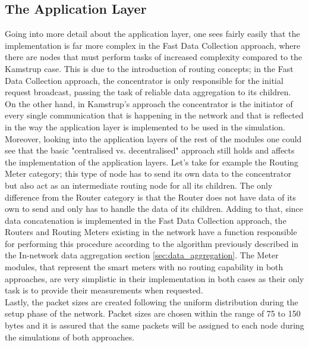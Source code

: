 \subsection{The Application Layer}
Going into more detail about the application layer, one sees fairly easily that the implementation is far more complex in the Fast Data Collection approach, where there are nodes that must perform tasks of increased complexity compared to the Kamstrup case. This is due to the introduction of routing concepts; in the Fast Data Collection approach, the concentrator is only responsible for the initial request broadcast, passing the task of reliable data aggregation to its children. On the other hand, in Kamstrup's approach the concentrator is the initiator of every single communication that is happening in the network and that is reflected in the way the application layer is implemented to be used in the simulation.\\
Moreover, looking into the application layers of the rest of the modules one could see that the basic "centralised vs. decentralised" approach still holds and affects the implementation of the application layers. Let's take for example the Routing Meter category; this type of node has to send its own data to the concentrator but also act as an intermediate routing node for all its children. The only difference from the Router category is that the Router does not have data of its own to send and only has to handle the data of its children. Adding to that, since data concatenation is implemented in the Fast Data Collection approach, the Routers and Routing Meters existing in the network have a function responsible for performing this procedure according to the algorithm previously described in the In-network data aggregation section \ref{sec:data_aggregation}.
The Meter modules, that represent the smart meters with no routing capability in both approaches, are very simplistic in their implementation in both cases as their only task is to provide their measurements when requested.\\
Lastly, the packet sizes are created following the uniform distribution during the setup phase of the network. Packet sizes are chosen within the range of 75 to 150 bytes and it is assured that the same packets will be assigned to each node during the simulations of both approaches.


